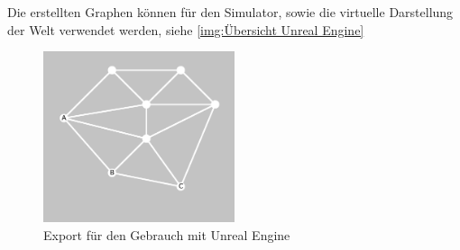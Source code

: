 Die erstellten Graphen können für den Simulator, sowie die virtuelle Darstellung der Welt verwendet werden, siehe \ref{img:Übersicht Unreal Engine}

\begin{figure}[h!]
            \centering
            \includegraphics[width=0.5\textwidth]{img/graphmorph/graph_morph4.png}
            \caption{Export für den Gebrauch mit Unreal Engine}
        \label{img:Graph Export für Unreal Engine}
\end{figure}

